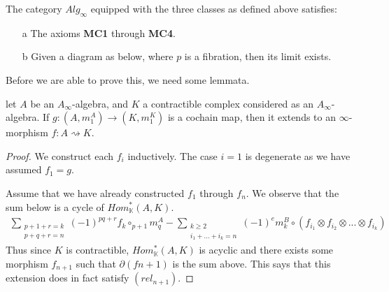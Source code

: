 \documentclass[../thesis.tex]{subfiles}
\begin{document}
        \begin{thm}\label{thm: model-A-inf}
            The category $Alg_\infty$ equipped with the three classes as defined above satisfies:
            \begin{itemize} 
                \item[a] The axioms \textbf{MC1} through \textbf{MC4}.
                \item[b] Given a diagram as below, where $p$ is a fibration, then its limit exists.
                \begin{center}
                \end{center}
            \end{itemize}
        \end{thm}

        Before we are able to prove this, we need some lemmata.

        \begin{lemma}
            let $A$ be an $A_\infty$-algebra, and $K$ a contractible complex considered as an $A_\infty$-algebra. If $g: (A,m_1^A) \rightarrow (K, m_1^K)$ is a cochain map, then it extends to an $\infty$-morphism $f: A \rightsquigarrow K$.
        \end{lemma}

        \begin{proof}
            We construct each $f_i$ inductively. The case $i=1$ is degenerate as we have assumed $f_1 = g$.

            Assume that we have already constructed $f_1$ through $f_n$. We observe that the sum below is a cycle of $Hom^*_\mathbb{K}(A,K)$.
            \begin{align*}
                \sum_{\substack{p + 1 + r = k \\ p + q + r = n}}(-1)^{pq+r}f_k\circ_{p+1}m^A_q - \sum_{\substack{k\geq 2 \\ i_1 + ... + i_k = n}}(-1)^{e}m^B_k \circ (f_{i_1}\otimes f_{i_2}\otimes ... \otimes f_{i_k})
            \end{align*}
            Thus since $K$ is contractible, $Hom^*_\mathbb{K}(A,K)$ is acyclic and there exists some morphism $f_{n+1}$ such that $\partial (f{n+1})$ is the sum above. This says that this extension does in fact satisfy $(rel_{n+1})$.
        \end{proof}
\end{document}
